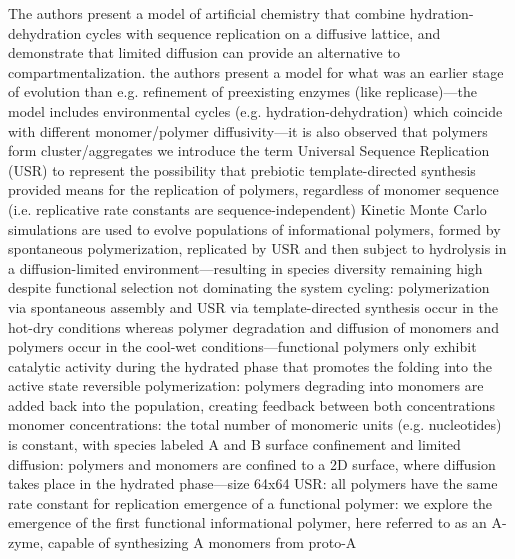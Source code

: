 \markdownRendererDocumentBegin
{} The authors present a model of artificial chemistry that combine hydration-dehydration cycles with sequence replication on a diffusive lattice, and demonstrate that limited diffusion can provide an alternative to compartmentalization.\markdownRendererInterblockSeparator
{}\markdownRendererUlBegin
\markdownRendererUlItem the authors present a model for what was an earlier stage of evolution than e.g. refinement of preexisting enzymes (like replicase)—the model includes environmental cycles (e.g. hydration-dehydration) which coincide with different monomer/polymer diffusivity—it is also observed that polymers form cluster/aggregates\markdownRendererUlItemEnd 
\markdownRendererUlItem we introduce the term Universal Sequence Replication (USR) to represent the possibility that prebiotic template-directed synthesis provided means for the replication of polymers, regardless of monomer sequence (i.e. replicative rate constants are sequence-independent)\markdownRendererUlItemEnd 
\markdownRendererUlItem Kinetic Monte Carlo simulations are used to evolve populations of informational polymers, formed by spontaneous polymerization, replicated by USR and then subject to hydrolysis in a diffusion-limited environment—resulting in species diversity remaining high despite functional selection not dominating the system\markdownRendererUlItemEnd 
\markdownRendererUlItem cycling: polymerization via spontaneous assembly and USR via template-directed synthesis occur in the hot-dry conditions whereas polymer degradation and diffusion of monomers and polymers occur in the cool-wet conditions—functional polymers only exhibit catalytic activity during the hydrated phase that promotes the folding into the active state\markdownRendererUlItemEnd 
\markdownRendererUlItem reversible polymerization: polymers degrading into monomers are added back into the population, creating feedback between both concentrations\markdownRendererUlItemEnd 
\markdownRendererUlItem monomer concentrations: the total number of monomeric units (e.g. nucleotides) is constant, with species labeled A and B\markdownRendererUlItemEnd 
\markdownRendererUlItem surface confinement and limited diffusion: polymers and monomers are confined to a 2D surface, where diffusion takes place in the hydrated phase—size 64x64\markdownRendererUlItemEnd 
\markdownRendererUlItem USR: all polymers have the same rate constant for replication\markdownRendererUlItemEnd 
\markdownRendererUlItem emergence of a functional polymer: we explore the emergence of the first functional informational polymer, here referred to as an A-zyme, capable of synthesizing A monomers from proto-A\markdownRendererUlItemEnd 

